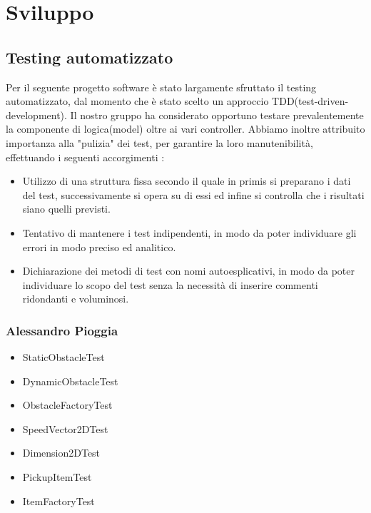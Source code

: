 
\chapter{Sviluppo}
\section{Testing automatizzato}

Per il seguente progetto software è stato largamente sfruttato il testing automatizzato, dal momento che è stato scelto un approccio TDD(test-driven-development). Il nostro gruppo ha considerato opportuno testare prevalentemente la componente di logica(model) oltre ai vari controller.
Abbiamo inoltre attribuito importanza alla "pulizia" dei test, per garantire la loro manutenibilità, effettuando i seguenti accorgimenti : 

\begin{itemize}
	\item Utilizzo di una struttura fissa secondo il quale in primis si preparano i dati del test, successivamente si opera su di essi ed infine si controlla che i risultati siano quelli previsti. 
	\item Tentativo di mantenere i test indipendenti, in modo da poter individuare gli errori in modo preciso ed analitico.
	\item Dichiarazione dei metodi di test con nomi autoesplicativi, in modo da poter individuare lo scopo del test senza la necessità di inserire commenti ridondanti e voluminosi.
\end{itemize}

\subsection*{Alessandro Pioggia}

\begin{itemize}
	\item StaticObstacleTest
	\item DynamicObstacleTest
	\item ObstacleFactoryTest
	\item SpeedVector2DTest
	\item Dimension2DTest
	\item PickupItemTest
	\item ItemFactoryTest
\end{itemize}

